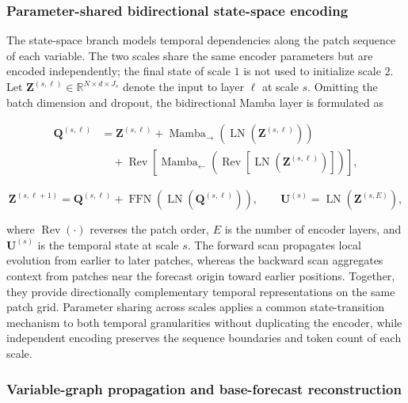 \subsubsection{Parameter-shared bidirectional state-space encoding}

The state-space branch models temporal dependencies along the patch sequence of each variable. The two scales share the same encoder parameters but are encoded independently; the final state of scale \(1\) is not used to initialize scale \(2\). Let \(\mathbf{Z}^{(s,\ell)}\in\mathbb{R}^{N\times d\times J_s}\) denote the input to layer \(\ell\) at scale \(s\). Omitting the batch dimension and dropout, the bidirectional Mamba layer is formulated as

\begin{equation}
\begin{aligned}
\mathbf{Q}^{(s,\ell)}
&=\mathbf{Z}^{(s,\ell)}
+\operatorname{Mamba}_{\rightarrow}
\!\left(\operatorname{LN}(\mathbf{Z}^{(s,\ell)})\right)\\
&\quad
+\operatorname{Rev}\!\left[
\operatorname{Mamba}_{\leftarrow}
\!\left(\operatorname{Rev}
\!\left[\operatorname{LN}(\mathbf{Z}^{(s,\ell)})\right]\right)
\right],
\end{aligned}
\label{eq:bidirectional-mamba}
\end{equation}

\begin{equation}
\mathbf{Z}^{(s,\ell+1)}
=\mathbf{Q}^{(s,\ell)}
+\operatorname{FFN}\!\left(\operatorname{LN}(\mathbf{Q}^{(s,\ell)})\right),
\qquad
\mathbf{U}^{(s)}=\operatorname{LN}(\mathbf{Z}^{(s,E)}),
\label{eq:mamba-ffn}
\end{equation}

where \(\operatorname{Rev}(\cdot)\) reverses the patch order, \(E\) is the number of encoder layers, and \(\mathbf{U}^{(s)}\) is the temporal state at scale \(s\). The forward scan propagates local evolution from earlier to later patches, whereas the backward scan aggregates context from patches near the forecast origin toward earlier positions. Together, they provide directionally complementary temporal representations on the same patch grid. Parameter sharing across scales applies a common state-transition mechanism to both temporal granularities without duplicating the encoder, while independent encoding preserves the sequence boundaries and token count of each scale.

\subsubsection{Variable-graph propagation and base-forecast reconstruction}

